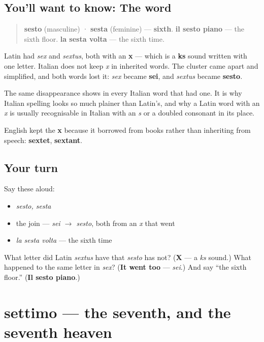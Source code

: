 \subsection*{You'll want to know: The word}
\begin{quote}
\textbf{sesto} (masculine) · \textbf{sesta} (feminine) — \textbf{sixth}. \textbf{il sesto piano} — the sixth floor. \textbf{la sesta volta} — the sixth time.
\end{quote}

\begin{cousinweb}
Latin had \emph{sex} and \emph{sextus}, both with an \textbf{x} — which is a \textbf{ks} sound written with one letter. Italian does not keep \emph{x} in inherited words. The cluster came apart and simplified, and both words lost it: \emph{sex} became \textbf{sei}, and \emph{sextus} became \textbf{sesto}.

The same disappearance shows in every Italian word that had one. It is why Italian spelling looks so much plainer than Latin's, and why a Latin word with an \emph{x} is usually recognisable in Italian with an \emph{s} or a doubled consonant in its place.

English kept the \textbf{x} because it borrowed from books rather than inheriting from speech: \textbf{sextet}, \textbf{sextant}.
\end{cousinweb}

\subsection*{Your turn}
Say these aloud:

\begin{itemize}
\raggedright
  \item \emph{sesto, sesta}
  \item the join — \emph{sei $\to$ sesto}, both from an \emph{x} that went
  \item \emph{la sesta volta} — the sixth time
\end{itemize}

\begin{tcolorbox}[breakable,colback=teal!4,colframe=teal!35!black,title={Before you move on}]
What letter did Latin \emph{sextus} have that \emph{sesto} has not? (\textbf{X} — a \emph{ks} sound.) What happened to the same letter in \emph{sex}? (\textbf{It went too} — \emph{sei}.) And say \textquotedblleft{}the sixth floor.\textquotedblright{} (\textbf{Il sesto piano}.)
\end{tcolorbox}
\section[settimo / settima]{settimo — the seventh, and the seventh heaven}

